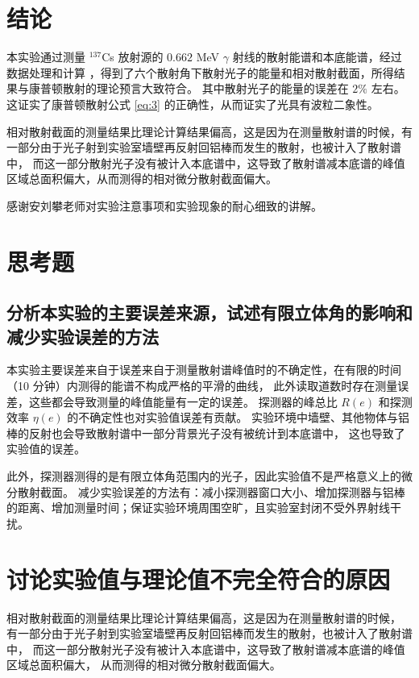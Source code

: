 \documentclass[revtex4-2]{mpltx}
\begin{document}
\section{结论}
本实验通过测量 ${}^{137}$Cs 放射源的 $0.662$ MeV $\gamma$ 射线的散射能谱和本底能谱，经过数据处理和计算
，得到了六个散射角下散射光子的能量和相对散射截面，所得结果与康普顿散射的理论预言大致符合。
其中散射光子的能量的误差在 $2\%$ 左右。
这证实了康普顿散射公式 \eqref{eq:3} 的正确性，从而证实了光具有波粒二象性。

相对散射截面的测量结果比理论计算结果偏高，这是因为在测量散射谱的时候，有一部分由于光子射到实验室墙壁再反射回铝棒而发生的散射，也被计入了散射谱中，
而这一部分散射光子没有被计入本底谱中，这导致了散射谱减本底谱的峰值区域总面积偏大，从而测得的相对微分散射截面偏大。


\begin{acknowledgments}
    感谢安刘攀老师对实验注意事项和实验现象的耐心细致的讲解。
\end{acknowledgments}


\clearpage %
\appendix %
\section{思考题}\label{app:exercise}
\subsection{分析本实验的主要误差来源，试述有限立体角的影响和减少实验误差的方法}
本实验主要误差来自于误差来自于测量散射谱峰值时的不确定性，在有限的时间（10 分钟）内测得的能谱不构成严格的平滑的曲线，
此外读取道数时存在测量误差，这些都会导致测量的峰值能量有一定的误差。
探测器的峰总比 $R(e)$ 和探测效率 $\eta(e)$ 的不确定性也对实验值误差有贡献。
实验环境中墙壁、其他物体与铝棒的反射也会导致散射谱中一部分背景光子没有被统计到本底谱中，
这也导致了实验值的误差。

此外，探测器测得的是有限立体角范围内的光子，因此实验值不是严格意义上的微分散射截面。
减少实验误差的方法有：减小探测器窗口大小、增加探测器与铝棒的距离、增加测量时间；保证实验环境周围空旷，且实验室封闭不受外界射线干扰。

\section{讨论实验值与理论值不完全符合的原因}
相对散射截面的测量结果比理论计算结果偏高，这是因为在测量散射谱的时候，
有一部分由于光子射到实验室墙壁再反射回铝棒而发生的散射，也被计入了散射谱中，
而这一部分散射光子没有被计入本底谱中，这导致了散射谱减本底谱的峰值区域总面积偏大，
从而测得的相对微分散射截面偏大。
\end{document}
